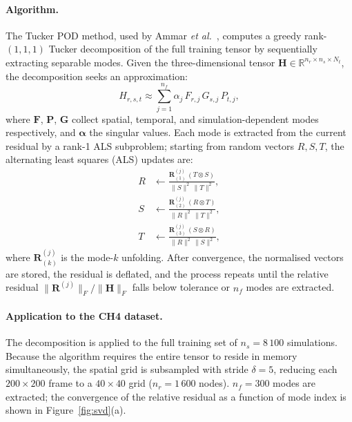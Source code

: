 \documentclass[a4paper, twocolumn]{article}
\newcommand{\R}{\mathbb{R}}
\begin{document}
\paragraph{Algorithm.}
The Tucker POD method, used by Ammar \emph{et al.}~\cite{ammar2024hybrid}, computes a greedy rank-$(1,1,1)$ Tucker decomposition \cite{kolda2009tensor} of the full training tensor by sequentially extracting separable modes. Given the three-dimensional tensor $\bm{H} \in \R^{n_r \times n_s \times N_t}$, the decomposition seeks an approximation:
\begin{equation}
    H_{r,s,t} \approx \sum_{j=1}^{n_f} \alpha_j\, F_{r,j}\, G_{s,j}\, P_{t,j},
    \label{eq:tucker}
\end{equation}
where $\bm{F}$, $\bm{P}$, $\bm{G}$ collect spatial, temporal, and simulation-dependent modes respectively, and $\bm{\alpha}$ the singular values. Each mode is extracted from the current residual by a rank-1 ALS subproblem; starting from random vectors $R, S, T$, the alternating least squares (ALS) updates are:
\begin{equation}
\begin{split}
    R &\leftarrow \frac{\bm{R}^{(j)}_{(1)}\,(T \otimes S)}{\|S\|^2\,\|T\|^2}, \\
    S &\leftarrow \frac{\bm{R}^{(j)}_{(2)}\,(R \otimes T)}{\|R\|^2\,\|T\|^2}, \\
    T &\leftarrow \frac{\bm{R}^{(j)}_{(3)}\,(S \otimes R)}{\|R\|^2\,\|S\|^2},
\end{split}
    \label{eq:als}
\end{equation}
where $\bm{R}^{(j)}_{(k)}$ is the mode-$k$ unfolding. After convergence, the normalised vectors are stored, the residual is deflated, and the process repeats until the relative residual $\|\bm{R}^{(j)}\|_F / \|\bm{H}\|_F$ falls below tolerance or $n_f$ modes are extracted.

\paragraph{Application to the CH4 dataset.}
The decomposition is applied to the full training set of $n_s = 8\,100$ simulations. Because the algorithm requires the entire tensor to reside in memory simultaneously, the spatial grid is subsampled with stride $\delta = 5$, reducing each $200 \times 200$ frame to a $40 \times 40$ grid ($n_r = 1\,600$ nodes). $n_f = 300$ modes are extracted; the convergence of the relative residual as a function of mode index is shown in Figure~\ref{fig:svd}(a).
\end{document}
